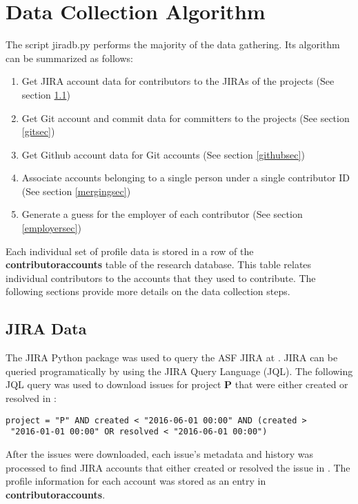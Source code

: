 \section{Data Collection Algorithm}
The script jiradb.py performs the majority of the data gathering. Its algorithm can be summarized as follows:
\begin{enumerate}
	\item Get JIRA account data for contributors to the JIRAs of the projects (See section \ref{jirasec})
	\item Get Git account and commit data for committers to the projects (See section \ref{gitsec})
	\item Get Github account data for Git accounts (See section \ref{githubsec})
	\item Associate accounts belonging to a single person under a single contributor ID (See section \ref{mergingsec})
	\item Generate a guess for the employer of each contributor (See section \ref{employersec})
\end{enumerate}

Each individual set of profile data is stored in a row of the \textbf{contributoraccounts} table of the research database. This table relates individual contributors to the accounts that they used to contribute. The following sections provide more details on the data collection steps.

\subsection{JIRA Data}\label{jirasec}
The JIRA Python package was used to query the ASF JIRA at \ASFJIRAURL. JIRA can be queried programatically by using the JIRA Query Language (JQL). The following JQL query was used to download issues for project \textbf{P} that were either created or resolved in \timeperiod{}:
\begin{lstlisting}
project = "P" AND created < "2016-06-01 00:00" AND (created >
 "2016-01-01 00:00" OR resolved < "2016-06-01 00:00")
\end{lstlisting}
After the issues were downloaded, each issue's metadata and history was processed to find JIRA accounts that either created or resolved the issue in \timeperiod{}. The profile information for each account was stored as an entry in \textbf{contributoraccounts}.
